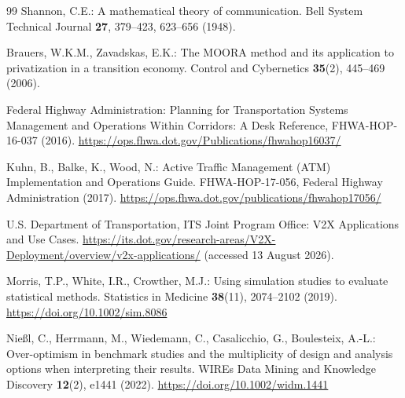 \documentclass[runningheads,orivec]{llncs}
\begin{document}
\begin{thebibliography}{99}
Shannon, C.E.:
A mathematical theory of communication.
Bell System Technical Journal \textbf{27}, 379--423, 623--656 (1948).

Brauers, W.K.M., Zavadskas, E.K.:
The MOORA method and its application to privatization in a transition economy.
Control and Cybernetics \textbf{35}(2), 445--469 (2006).

Federal Highway Administration:
Planning for Transportation Systems Management and Operations Within Corridors: A Desk
Reference, FHWA-HOP-16-037 (2016).
\url{https://ops.fhwa.dot.gov/Publications/fhwahop16037/}

Kuhn, B., Balke, K., Wood, N.:
Active Traffic Management (ATM) Implementation and Operations Guide.
FHWA-HOP-17-056, Federal Highway Administration (2017).
\url{https://ops.fhwa.dot.gov/publications/fhwahop17056/}

U.S. Department of Transportation, ITS Joint Program Office:
V2X Applications and Use Cases.
\url{https://its.dot.gov/research-areas/V2X-Deployment/overview/v2x-applications/}
(accessed 13 August 2026).

Morris, T.P., White, I.R., Crowther, M.J.:
Using simulation studies to evaluate statistical methods.
Statistics in Medicine \textbf{38}(11), 2074--2102 (2019).
\url{https://doi.org/10.1002/sim.8086}

Nie{\ss}l, C., Herrmann, M., Wiedemann, C., Casalicchio, G., Boulesteix, A.-L.:
Over-optimism in benchmark studies and the multiplicity of design and analysis options
when interpreting their results.
WIREs Data Mining and Knowledge Discovery \textbf{12}(2), e1441 (2022).
\url{https://doi.org/10.1002/widm.1441}

\end{thebibliography}
\end{document}
